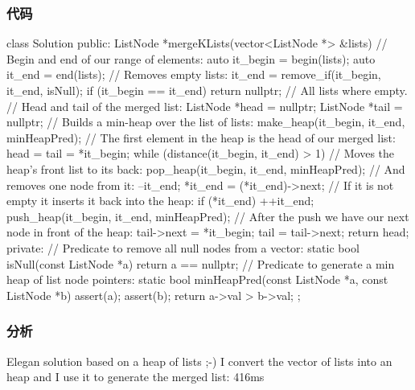 \subsubsection{代码}
\begin{Code}
class Solution {
public:
    ListNode *mergeKLists(vector<ListNode *> &lists) {
        // Begin and end of our range of elements:
        auto it_begin = begin(lists);
        auto it_end = end(lists);
        // Removes empty lists:
        it_end = remove_if(it_begin, it_end, isNull);
        if (it_begin == it_end) return nullptr; // All lists where empty.
        // Head and tail of the merged list:
        ListNode *head = nullptr;
        ListNode *tail = nullptr;
        // Builds a min-heap over the list of lists:
        make_heap(it_begin, it_end, minHeapPred);
        // The first element in the heap is the head of our merged list:
        head = tail = *it_begin;
        while (distance(it_begin, it_end) > 1) {
            // Moves the heap's front list to its back:
            pop_heap(it_begin, it_end, minHeapPred);
            // And removes one node from it:
            --it_end;
            *it_end = (*it_end)->next;
            // If it is not empty it inserts it back into the heap:
            if (*it_end) {
                ++it_end;
                push_heap(it_begin, it_end, minHeapPred);
            }
            // After  the push we have our next node in front of the heap:
            tail->next = *it_begin;
            tail = tail->next;
        }
        return head;
    }
private:
    // Predicate to remove all null nodes from a vector:
    static bool isNull(const ListNode *a) {
        return a == nullptr;
    }
    // Predicate to generate a min heap of list node pointers:
    static bool minHeapPred(const ListNode *a,
                            const ListNode *b) {
        assert(a);
        assert(b);
        return a->val > b->val;
    }
};
\end{Code}

\subsubsection{分析}
Elegan solution based on a heap of lists ;-) I convert the vector of lists into an heap and I use it to generate the merged list: 416ms

